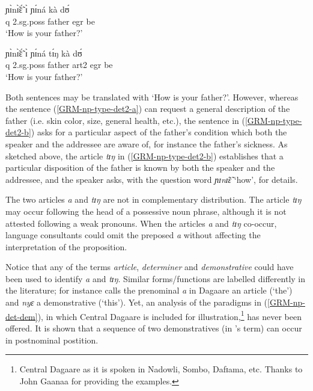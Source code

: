 \begin{exe}
\begin{exe}
\begin{exe}
{\begin{exe}
\begin{exe}
\begin{exe}
\begin{exe}
\ea\label{GRM-np-type-det2-ab}
 
  \ea\label{GRM-np-type-det2-a}
\gll ɲɪ̀nɪ̃̀ɛ̃́ ɪ̀ ɲɪ́ná kà dʊ́\\
    {\sc q} {\sc 2.sg.poss} father {\sc  egr} be  \\
\glt  `How is your father?'

  \ex\label{GRM-np-type-det2-b}
\gll ɲɪ̀nɪ̃̀ɛ̃́ ɪ̀ ɲɪ́ná tɪ́ŋ kà dʊ́ \\
   {\sc q} {\sc 2.sg.poss} father {\sc art2} {\sc  egr} be \\
\glt  `How is your father?'
  
 
\z 
 \z


Both sentences may be translated with `How is your father?'. However, whereas 
the sentence (\ref{GRM-np-type-det2-a}) can request  a general description
of the father (i.e. skin color, size, general health, etc.), the sentence
in (\ref{GRM-np-type-det2-b}) asks for a particular aspect of the
father's condition which both the speaker and the addressee are aware of, for
instance the father's sickness. As sketched above, the article {\it tɪŋ}  in
(\ref{GRM-np-type-det2-b}) establishes that a particular disposition of the
father is known  by both the speaker and the addressee,  and the speaker
asks, with the question word {\it ɲɪnɪ̃ɛ̃} `how',   for details. 

The two  articles {\it a} and {\it tɪŋ}  are not in complementary distribution.
The article {\it tɪŋ} may occur following the head of a possessive noun phrase,
although it is not attested  following a weak pronouns. When the articles {\it 
a} and {\it tɪŋ} co-occur,  language consultants could omit
the preposed {\it a}  without affecting the interpretation of the
 proposition. 

Notice that any of the terms {\it article}, {\it determiner} and
{\it demonstrative} could have been used to identify {\it a} and {\it tɪŋ}.
Similar forms/functions are labelled differently in the
literature; for instance \citet[47]{Bodo97} calls the prenominal {\it a} in
Dagaare an article (`the')  and  {\it nyɛ} a demonstrative (`this').  Yet, an
analysis of the paradigms in (\ref{GRM-np-det-dem}),  in which Central Dagaare
is
included for illustration,\footnote{Central Dagaare as it is spoken in Nadowli,
Sombo, Dafɪama, etc. Thanks to John Gaanaa for providing the examples. } has
never been offered. It is shown that a sequence of two demonstratives (in
\citeauthor{Bodo97}'s term)  can occur in postnominal postition.



\end{exe}
\end{exe}
\end{exe}
\end{exe}}
\end{exe}
\end{exe}
\end{exe}
